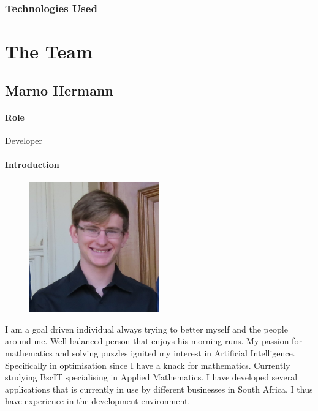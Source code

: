 \documentclass{article}
\begin{document}
        \subsubsection{Technologies Used}
            \lipsum[1]
            
            \lipsum[2]
            
            \lipsum[3]
            
\newpage
\section{The Team}
    \subsection{Marno Hermann}
        \paragraph{Role} Developer
    
        \paragraph{Introduction}
            \begin{figure}
              \begin{center}
                \vspace{-0.75cm}
                \includegraphics[width=0.5\textwidth]{img/marno.jpg}
              \end{center}
            \end{figure}
            I am a goal driven individual always trying to better myself and the people around me. Well balanced person that enjoys his morning runs. My passion for mathematics and solving puzzles ignited my interest in Artificial Intelligence. Specifically in optimisation since I have a knack for mathematics. Currently studying BscIT specialising in Applied Mathematics. I have developed several applications that is currently in use by different businesses in South Africa. I thus have experience in the development environment.   
        
\end{document}
